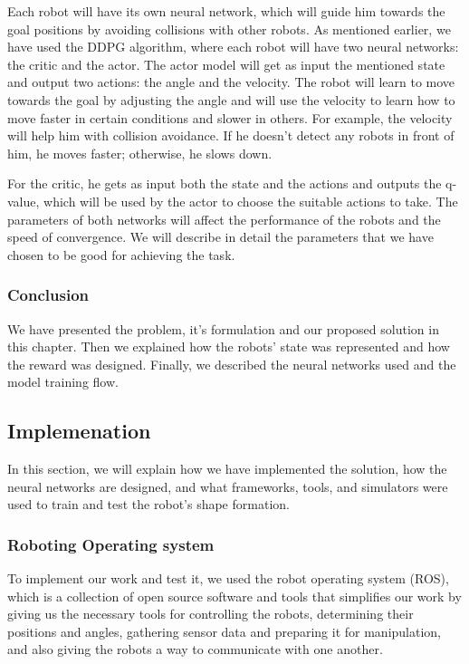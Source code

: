 \documentclass[12pt]{extarticle}
\begin{document}
Each robot will have its own neural network, which will guide him towards the goal positions by avoiding collisions with other robots.
As mentioned earlier, we have used the DDPG algorithm, where each robot will have two neural networks: the critic and the actor.
The actor model will get as input the mentioned state and output two actions: the angle and the velocity.
The robot will learn to move towards the goal by adjusting the angle and will use the velocity to learn how to move faster in certain conditions and slower in others. For example, the velocity will help him with collision avoidance. If he doesn't detect any robots in front of him, he moves faster; otherwise, he slows down.

For the critic, he gets as input both the state and the actions and outputs the q-value, which will be used by the actor to choose the suitable actions to take.
The parameters of both networks will affect the performance of the robots and the speed of convergence. We will describe in detail the parameters that we have chosen to be good for achieving the task.










 

\subsubsection{Conclusion}
We have presented the problem, it's formulation and our proposed solution in this chapter. Then we explained how the robots' state was represented and how the reward was designed. Finally, we described the neural networks used and the  model training flow.



\subsection{Implemenation}

In this section, we will explain how we have implemented the solution, how the neural networks are designed, and what frameworks, tools, and simulators were used to train and test the robot's shape formation.











\subsubsection{Roboting Operating system}
To implement our work and test it, we used the robot operating system (ROS), which is a collection of open source software and tools that simplifies our work by giving us the necessary tools for controlling the robots, determining their positions and angles, gathering sensor data and preparing it for manipulation, and also giving the robots a way to communicate with one another.
\end{document}
